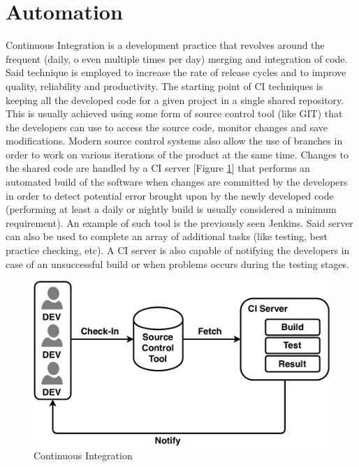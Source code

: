 \section{Automation}

Continuous Integration \cite{CI} is a development practice that revolves around the frequent (daily, o even multiple times per day) merging and integration of code. Said technique is employed to increase the rate of release cycles and to improve quality, reliability and productivity. The starting point of CI techniques is keeping all the developed code for a given project in a single shared repository. This is usually achieved using some form of source control tool (like GIT) that the developers can use to access the source code, monitor changes and save modifications. Modern source control systems also allow the use of branches in order to work on various iterations of the product at the same time. Changes to the shared code are handled by a CI server [Figure \ref{fig:CI}] that performs an automated build of the software when changes are committed by the developers in order to detect potential error brought upon by the newly developed code (performing at least a daily or nightly build is usually considered a minimum requirement). An example of such tool is the previously seen Jenkins. Said server can also be used to complete an array of additional tasks (like testing, best practice checking, etc). A CI server is also capable of notifying the developers in case of an unsuccessful build or when problems occurs during the testing stages.

\begin{figure}[ht]
	\centering
	\includegraphics[scale=0.7]{Images/CI.pdf}
	\caption{Continuous Integration}
	\label{fig:CI}
\end{figure}

